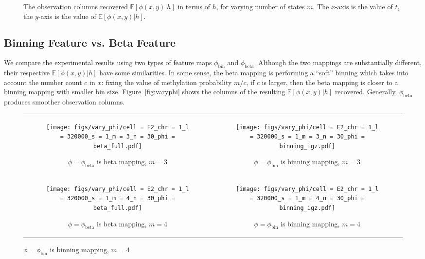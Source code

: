 \documentclass{article}
\def\E{\mathbb{E}}
\def\bin{\text{bin}}
\def\bet{\text{beta}}
\begin{document}
{\begin{figure}[H]
    \caption{The observation columns recovered $\E[\phi(x,y)|h]$ in terms of $h$, for varying number of states $m$. The $x$-axis is the value of $t$, the $y$-axis is the value of $\E[\phi(x,y)|h]$.}
    \label{fig:varym}
\end{figure}

\subsection{Binning Feature vs. Beta Feature}

We compare the experimental results using two types of feature maps $\phi_{\bin}$ and $\phi_{\bet}$. Although the two mappings are substantially different, their respective $\E[\phi(x,y)|h]$ have some similarities. In some sense, the beta mapping is performing a ``soft'' binning which takes into account the number count $c$ in $x$: fixing the value of methylation probability $m/c$, if $c$ is larger, then the beta mapping is closer to a binning mapping with smaller bin size. Figure~\ref{fig:varyphi} shows the columns of the resulting $\E[\phi(x,y)|h]$ recovered. Generally, $\phi_{\bet}$ produces smoother observation columns.


\begin{figure}[H]
    \begin{tabular}{cc}
        \begin{subfigure}[t]{0.45\textwidth}
        \texttt{[image: figs/vary\_phi/cell = E2\_chr = 1\_l = 320000\_s = 1\_m = 3\_n = 30\_phi = beta\_full.pdf]}
        \caption{$\phi = \phi_{\bet}$ is beta mapping, $m = 3$}
    \end{subfigure}
    &
    \begin{subfigure}[t]{0.45\textwidth}
        \texttt{[image: figs/vary\_phi/cell = E2\_chr = 1\_l = 320000\_s = 1\_m = 3\_n = 30\_phi = binning\_igz.pdf]}
        \caption{$\phi = \phi_{\bin}$ is binning mapping, $m = 3$}
    \end{subfigure}
    \\
    \begin{subfigure}[t]{0.45\textwidth}
        \texttt{[image: figs/vary\_phi/cell = E2\_chr = 1\_l = 320000\_s = 1\_m = 4\_n = 30\_phi = beta\_full.pdf]}
        \caption{$\phi = \phi_{\bet}$ is beta mapping, $m = 4$}
    \end{subfigure}
    &
    \begin{subfigure}[t]{0.45\textwidth}
        \texttt{[image: figs/vary\_phi/cell = E2\_chr = 1\_l = 320000\_s = 1\_m = 4\_n = 30\_phi = binning\_igz.pdf]}
        \caption{$\phi = \phi_{\bin}$ is binning mapping, $m = 4$}
    \end{subfigure}
    \end{tabular}


\end{figure}}
\end{document}
